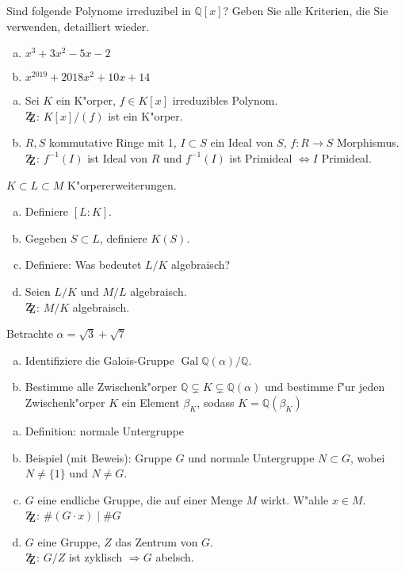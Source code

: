 \documentclass[a4paper,ngerman,12pt,addpoints]{exam}
\newcommand{\setQ}{\mathbb{Q}}
\DeclareMathOperator{\Gal}{Gal}
\begin{document}
		\begin{questions}
		\question[12]
			Sind folgende Polynome irreduzibel in $\setQ[x]$? Geben Sie alle Kriterien, die Sie verwenden, detailliert wieder.
			\begin{enumerate}[a)]
				\item $x^3+3x^2-5x-2$
				\item $x^{2019}+2018x^2+10x+14$
			\end{enumerate}
		\question[12]
			\begin{enumerate}[a)]
				\item Sei $K$ ein K"orper, $f \in K[x]$ irreduzibles Polynom.\\ $\mathrm{Z\kern-.3em\raise-0.5ex\hbox{Z}}$: $K[x]/(f)$ ist ein K"orper.
				\item $R, S$ kommutative Ringe mit 1, $I \subset S$ ein Ideal von $S$, $f: R \longrightarrow S$ Morphismus.\\
				$\mathrm{Z\kern-.3em\raise-0.5ex\hbox{Z}}$: $f^{-1}(I)$ ist Ideal von $R$ und $f^{-1}(I)$ ist Primideal $\Leftrightarrow I$ Primideal.
			\end{enumerate}
		\question[12]
			$K \subset L \subset M$ K"orpererweiterungen.
			\begin{enumerate}[a)]
				\item Definiere $[L:K]$.
				\item Gegeben $S \subset L$, definiere $K(S)$.
				\item Definiere: Was bedeutet $L/K$ algebraisch?
				\item Seien $L/K$ und $M/L$ algebraisch.\\ $\mathrm{Z\kern-.3em\raise-0.5ex\hbox{Z}}$: $M/K$ algebraisch.
			\end{enumerate}
		\question[12]
			Betrachte $\alpha = \sqrt{3}+\sqrt{7}$
			\begin{enumerate}[a)]
				\item Identifiziere die Galois-Gruppe $\Gal{\setQ(\alpha)/\setQ}$.
				\item Bestimme alle Zwischenk"orper $\setQ \subsetneq K \subsetneq \setQ(\alpha)$ und bestimme f"ur jeden Zwischenk"orper $K$ ein Element $\beta_K$, sodass $K=\setQ(\beta_K)$
			\end{enumerate}
		\question[12]
			\begin{enumerate}[a)]
				\item Definition: normale Untergruppe
				\item Beispiel (mit Beweis): Gruppe $G$ und normale Untergruppe $N \subset G$, wobei $N \neq \{1\}$ und $N \neq G$.
				\item $G$ eine endliche Gruppe, die auf einer Menge $M$ wirkt. W"ahle $x \in M$. \\
				$\mathrm{Z\kern-.3em\raise-0.5ex\hbox{Z}}$: $\#(G \cdot x) \mid \#G$
				\item $G$ eine Gruppe, $Z$ das Zentrum von $G$.\\
				$\mathrm{Z\kern-.3em\raise-0.5ex\hbox{Z}}$: $G/Z$ ist zyklisch $\Rightarrow G$ abelsch.
			\end{enumerate}
	\end{questions}
	\begin{center}
		\gradetable[h][questions]
	\end{center}
\end{document}
